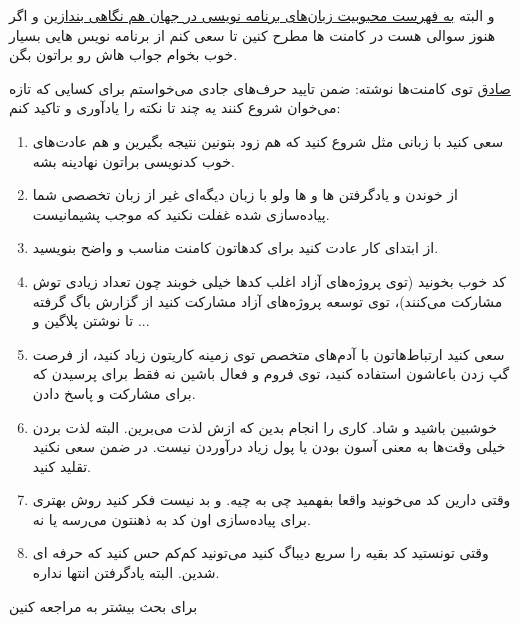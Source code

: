 و البته
\href{http://jadi.net/2010/12/\%D9\%85\%D8\%AD\%D8\%A8\%D9\%88\%D8\%A8\%D8\%AA\%D8\%B1\%DB\%8C\%D9\%86-\%D8\%B2\%D8\%A8\%D8\%A7\%D9\%86\%D9\%87\%D8\%A7\%DB\%8C-\%D8\%A8\%D8\%B1\%D9\%86\%D8\%A7\%D9\%85\%D9\%87-\%D9\%86\%D9\%88\%DB\%8C\%D8\%B3\%DB\%8C/}{به فهرست محبوبیت زبان‌های برنامه نویسی در جهان هم نگاهی بندازین}
و اگر هنوز سوالی هست در کامنت ها مطرح کنین تا سعی کنم از برنامه نویس هایی بسیار خوب بخوام جواب هاش رو براتون بگن.
\begin{mdframed}
\href{http://sadeq.ir}{صادق}
توی کامنت‌ها نوشته:
ضمن تایید حرف‌های جادی می‌خواستم برای کسایی که تازه می‌خوان شروع کنند یه چند تا نکته را یادآوری و تاکید کنم:
\begin{enumerate}
	\item سعی کنید با زبانی مثل  شروع کنید که هم زود بتونین نتیجه بگیرین و هم عادت‌های خوب کدنویسی براتون نهادینه بشه.
	\item از خوندن و یادگرفتن ها و ها ولو با زبان دیگه‌ای غیر از زبان تخصصی شما پیاده‌سازی شده غفلت نکنید که موجب پشیمانیست.
	\item  از ابتدای کار عادت کنید برای کدهاتون کامنت مناسب و واضح بنویسید.
	\item کد خوب بخونید (توی پروژه‌های آزاد اغلب کدها خیلی خوبند چون تعداد زیادی توش مشارکت می‌کنند)، توی توسعه پروژه‌های آزاد مشارکت کنید از گزارش باگ گرفته تا نوشتن پلاگین و ...
	\item  سعی کنید ارتباط‌هاتون با آدم‌های متخصص توی زمینه کاریتون زیاد کنید، از فرصت گپ زدن باعاشون استفاده کنید، توی فروم و  فعال باشین نه فقط برای پرسیدن که برای مشارکت و پاسخ دادن.
	\item خوشبین باشید و شاد. کاری را انجام بدین که ازش لذت می‌برین. البته لذت بردن خیلی وقت‌ها به معنی آسون بودن یا پول زیاد درآوردن نیست. در ضمن سعی نکنید تقلید کنید.
	\item وقتی دارین کد می‌خونید واقعا بفهمید چی به چیه. و بد نیست فکر کنید روش بهتری برای پیاده‌سازی اون کد به ذهنتون می‌رسه یا نه.
	\item وقتی تونستید کد بقیه را سریع دیباگ کنید می‌تونید کم‌کم حس کنید که حرفه ای شدین. البته یادگرفتن انتها نداره.
\end{enumerate}
\end{mdframed}
برای بحث بیشتر به  مراجعه کنین
